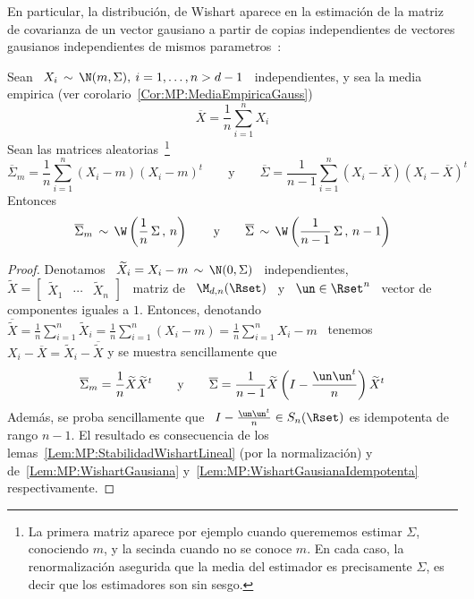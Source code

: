 %
En particular,  la distribuci\'on, de Wishart  aparece en la  estimaci\'on de la
matriz de covarianza de un vector  gausiano a partir de copias independientes de
vectores gausianos independientes de mismos parametros~\cite{KotNad04, BilBre99,
  And03, Seb04, GupNad04}:
%
\begin{corolario}\label{Cor:MP:WishartEstimacion}
  Sean  \  $X_i \,  \sim  \,  \N(m,\Sigma), \:  i  =  1, \ldots  ,  n  > d-1$  \
  independientes,       y      sea       la       media      empirica       (ver
  corolario~\ref{Cor:MP:MediaEmpiricaGauss})
  \[
  \overline{X} = \frac{1}{n} \sum_{i=1}^n X_i
  \]
  Sean las  matrices aleatorias~\footnote{La primera matriz  aparece por ejemplo
    cuando querememos estimar  $\Sigma$, conociendo $m$, y la  secinda cuando no
    se conoce $m$. En cada caso, la renormalizaci\'on asegurida que la media del
    estimador es  precisamente $\Sigma$,  es decir que  los estimadores  son sin
    sesgo.}
  \[
  \overline{\Sigma}_m =  \frac{1}{n} \sum_{i=1}^n (X_i  - m) (X_i -  m)^t \qquad
  \mbox{y} \qquad  \overline{\Sigma} =  \frac{1}{n-1} \sum_{i=1}^n \left(  X_i -
    \overline{X} \right) \left( X_i - \overline{X} \right)^t
  \]
  Entonces
  \[
  \overline{\Sigma}_m  \, \sim  \,  \W\left( \frac{1}{n}  \,  \Sigma \,  , \,  n
  \right)  \qquad   \mbox{y}  \qquad  \overline{\Sigma}  \,   \sim  \,  \W\left(
    \frac{1}{n-1} \, \Sigma \, , \, n-1 \right)
  \]
\end{corolario}
%
\begin{proof}
  Denotamos  \  $\widetilde{X}_i   =  X_i  -  m  \,   \sim  \,  \N(0,\Sigma)$  \
  independientes, \ $\widetilde{X} =  \begin{bmatrix} \widetilde{X}_1 & \cdots &
    \widetilde{X}_n \end{bmatrix}$  \ matriz de  \ $\M_{d,n}(\Rset)$ \ y  \ $\un
  \in  \Rset^n$ \  vector de  componentes  iguales a  $1$.  Entonces,  denotando
  $\overline{\widetilde{X}}   =  \frac{1}{n}   \sum_{i=1}^n   \widetilde{X}_i  =
  \frac{1}{n}  \sum_{i=1}^n (X_i  - m)  = \frac{1}{n}  \sum_{i=1}^n X_i  -  m$ \
  tenemos \ $X_i -  \overline{X} = \widetilde{X}_i - \overline{\widetilde{X}}$ y
  se muestra sencillamente que
  \[
  \overline{\Sigma}_m   =  \frac{1}{n}   \widetilde{X}   \widetilde{X}^t  \qquad
  \mbox{y}  \qquad \overline{\Sigma}  = \frac{1}{n-1}  \widetilde{X} \left(  I -
    \frac{\un \un^t}{n} \right) \widetilde{X}^t
  \]
  Adem\'as,  se  proba  sencillamente  que   \  $I  -  \frac{\un  \un^t}{n}  \in
  S_n(\Rset)$ es idempotenta de rango $n-1$. El resultado es consecuencia de los
  lemas~\ref{Lem:MP:StabilidadWishartLineal}   (por    la   normalizaci\'on)   y
  de~\ref{Lem:MP:WishartGausiana}       y~\ref{Lem:MP:WishartGausianaIdempotenta}
  respectivamente.
\end{proof}

